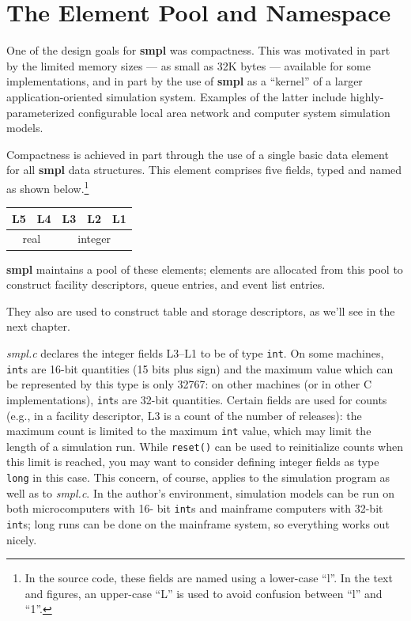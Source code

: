 \section{The Element Pool and Namespace}

One of the design goals for \textbf{smpl} was compactness. This was motivated in
part by the limited memory sizes --- as small as 32K bytes --- available for
some implementations, and in part by the use of \textbf{smpl} as a ``kernel'' of a larger
application-oriented simulation system. Examples of the latter include
highly-parameterized configurable local area network and computer system
simulation models.

Compactness is achieved in part through the use of a single basic data
element for all \textbf{smpl} data structures. This element comprises five fields,
typed and named as shown below.\footnote{In the source code, these fields are named using a lower-case ``l''. In the text and figures, an upper-case ``L'' is used to avoid confusion between ``l'' and ``1''.}

\begin{center}
\begin{tabular}{|c|c|c|c|c|}\hline
L5 & L4 & L3 & L2 & L1 \\ \hline
\multicolumn{2}{c}{real} & \multicolumn{3}{c}{integer}
\end{tabular}
\end{center}

\textbf{smpl} maintains a pool of these elements; elements are allocated from this
pool to construct facility descriptors, queue entries, and event list entries.

\noindent They also are used to construct table and storage descriptors, as we'll see in
the next chapter.

\textit{smpl.c} declares the integer fields L3--L1 to be of type \texttt{int}. On some
machines, \texttt{int}s are 16-bit quantities (15 bits plus sign) and the maximum
value which can be represented by this type is only 32767: on other machines
(or in other C implementations), \texttt{int}s are 32-bit quantities. Certain fields
are used for counts (e.g., in a facility descriptor, L3 is a count of the number of
releases): the maximum count is limited to the maximum \texttt{int} value, which
may limit the length of a simulation run. While \texttt{reset()} can be used to reinitialize
counts when this limit is reached, you may want to consider
defining integer fields as type \texttt{long} in this case. This concern, of course,
applies to the simulation program as well as to \textit{smpl.c}. In the author's
environment, simulation models can be run on both microcomputers with 16-
bit \texttt{int}s and mainframe computers with 32-bit \texttt{int}s; long runs can be done on
the mainframe system, so everything works out nicely.

